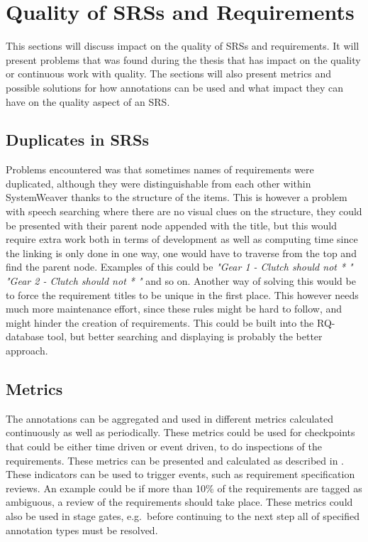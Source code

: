 \section{Quality of SRSs and Requirements}
This sections will discuss impact on the quality of SRSs and requirements. It will present problems that was found during the thesis that has impact on the quality or continuous work with quality. The sections will also present metrics and possible solutions for how annotations can be used and what impact they can have on the quality aspect of an SRS.

\subsection{Duplicates in SRSs}
Problems encountered was that sometimes names of requirements were duplicated, although they were distinguishable from each other within SystemWeaver thanks to the structure of the items. This is however a problem with speech searching where there are no visual clues on the structure, they could be presented with their parent node appended with the title, but this would require extra work both in terms of development as well as computing time since the linking is only done in one way, one would have to traverse from the top and find the parent node. Examples of this could be \emph{"Gear 1 - Clutch should not * "} \emph{"Gear 2 - Clutch should not * "} and so on. Another way of solving this would be to force the requirement titles to be unique in the first place. This however needs much more maintenance effort, since these rules might be hard to follow, and might hinder the creation of requirements. This could be built into the RQ-database tool, but better searching and displaying is probably the better approach.

\subsection{Metrics}
The annotations can be aggregated and used in different metrics calculated continuously as well as periodically. These metrics could be used for checkpoints that could be either time driven or event driven, to do inspections of the requirements. These metrics can be presented and calculated as described in \citet{ieeemetrix}. These indicators can be used to trigger events, such as requirement specification reviews. An example could be if more than 10\% of the requirements are tagged as ambiguous, a review of the requirements should take place. These metrics could also be used in stage gates, e.g.\ before continuing to the next step all of specified annotation types must be resolved.


